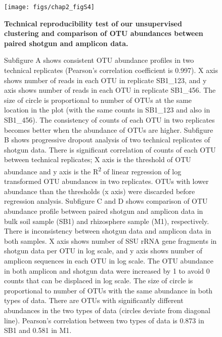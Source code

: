 \documentclass[]{msu-thesis}
\begin{document}
\begin{figure}[tbph!]
  \captionsetup{list=yes}
  \centering
  \texttt{[image: figs/chap2\_figS4]}
  \caption[Technical reproducibility test of our unsupervised clustering and comparison of OTU abundances between paired shotgun and amplicon data]{\textbf{Technical reproducibility test of our unsupervised clustering and comparison of OTU abundances between paired shotgun and amplicon data.}}
  \label{fig:chap2FigS4}
\end{figure}
\clearpage
\begin{figure}
  \captionsetup{labelformat=adja-page,list=no}
  \ContinuedFloat
  \caption[]{Subfigure A shows consistent OTU abundance profiles in two technical replicates (Pearson’s correlation coefficient is 0.997). X axis shows number of reads in each OTU in replicate SB1\_123, and y axis shows number of reads in each OTU in replicate SB1\_456. The size of circle is proportional to number of OTUs at the same location in the plot (with the same counts in SB1\_123 and also in SB1\_456).  The consistency of counts of each OTU in two replicates becomes better when the abundance of OTUs are higher. Subfigure B shows progressive dropout analysis of two technical replicates of shotgun data. There is significant correlation of counts of each OTU between technical replicates; X axis is the threshold of OTU abundance and y axis is the R\textsuperscript{2} of linear regression of log transformed OTU abundances in two replicates. OTUs with lower abundance than the thresholds (x axis) were discarded before regression analysis. Subfigure C and D shows comparison of OTU abundance profile between paired shotgun and amplicon data in bulk soil sample (SB1) and rhizosphere sample (M1), respectively. There is inconsistency between shotgun data and amplicon data in both samples. X axis shows number of SSU rRNA gene fragments in shotgun data per OTU in log scale, and y axis shows number of amplicon sequences in each OTU in log scale. The OTU abundance in both amplicon and shotgun data were increased by 1 to avoid 0 counts that can be displaced in log scale. The size of circle is proportional to number of OTUs with the same abundance in both types of data. There are OTUs with significantly different abundances in the two types of data (circles deviate from diagonal line). Pearson’s correlation between two types of data is 0.873 in SB1 and 0.581 in M1.}
\end{figure}
\end{document}
